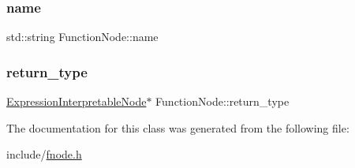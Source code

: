 \mbox{\label{classFunctionNode_a21284dd655c91da1f792dc3bc1bba60c}} 
\subsubsection{\texorpdfstring{name}{name}}
{\footnotesize\ttfamily std\+::string Function\+Node\+::name}

\mbox{\label{classFunctionNode_aaabd8ce2540b12cf113a0cb8082c3397}} 
\subsubsection{\texorpdfstring{return\+\_\+type}{return\_type}}
{\footnotesize\ttfamily \hyperlink{classExpressionInterpretableNode}{Expression\+Interpretable\+Node}$\ast$ Function\+Node\+::return\+\_\+type}



The documentation for this class was generated from the following file\+:\begin{DoxyCompactItemize}
\item 
include/\hyperlink{fnode_8h}{fnode.\+h}\end{DoxyCompactItemize}
